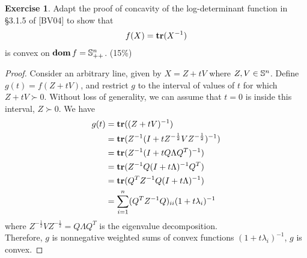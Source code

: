 \documentclass[12pt]{extarticle}
\theoremstyle{definition}
\newtheorem{exercise}{Exercise}
\begin{document}
\begin{exercise}
  Adapt the proof of concavity of the log-determinant function in \S 3.1.5 of [BV04] to show that
  \begin{align*}
    f(X)=\mathop{\bf tr} (X^{-1})
  \end{align*}
  is convex on $\mathop{\bf dom} f=\mathbb{S}_{++}^n$. (15\%)
\end{exercise}
\begin{proof}
  Consider an arbitrary line, given by $X=Z+tV$ where $Z, V\in\mathbb{S}^n$.
  Define $g(t)=f(Z+tV)$, and restrict $g$ to the interval of values of $t$ for which $Z+tV\succ 0$.
  Without loss of generality, we can assume that $t=0$ is inside this interval, \ie $Z\succ 0$. We have
  \begin{align*}
    g(t) &= \mathop{\bf tr} ((Z+tV)^{-1})\\
         &= \mathop{\bf tr} (Z^{-1}(I+tZ^{-\frac{1}{2}}VZ^{-\frac{1}{2}})^{-1})\\
         &= \mathop{\bf tr} (Z^{-1}(I+tQ\Lambda Q^T)^{-1})\\
         &= \mathop{\bf tr} (Z^{-1}Q(I+t\Lambda)^{-1}Q^T)\\
         &= \mathop{\bf tr} (Q^TZ^{-1}Q(I+t\Lambda)^{-1})\\
         &= \sum_{i=1}^n (Q^TZ^{-1}Q)_{ii}(1+t\lambda_i)^{-1}
  \end{align*}
  where $Z^{-\frac{1}{2}}VZ^{-\frac{1}{2}}=Q\Lambda Q^T$ is the eigenvalue decomposition.\\
  Therefore, $g$ is nonnegative weighted sums of convex functions $(1+t\lambda_i)^{-1}$, \ie $g$ is convex.
\end{proof}
\end{document}
